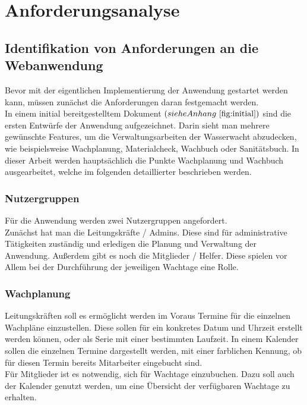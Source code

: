 \documentclass[fontsize=12pt,openright,oneside,paper=a4,BCOR=1cm]{scrbook}
\begin{document}

%
%

\chapter{Anforderungsanalyse}
\section{Identifikation von Anforderungen an die Webanwendung} 
Bevor mit der eigentlichen Implementierung der Anwendung gestartet werden kann, müssen zunächst die Anforderungen daran festgemacht werden. \\
In einem initial bereitgestelltem Dokument $(siehe Anhang ~\ref{fig:initial})$ sind die ersten Entwürfe der Anwendung aufgezeichnet. Darin sieht man mehrere gewünschte Features, um die Verwaltungsarbeiten der Wasserwacht abzudecken, wie beispielsweise \glqq Wachplanung\grqq{}, \glqq Materialcheck\grqq{}, \glqq Wachbuch\grqq{} oder \glqq Sanitätsbuch\grqq{}. In dieser Arbeit werden hauptsächlich die Punkte \glqq Wachplanung\grqq{} und \glqq Wachbuch\grqq{} ausgearbeitet, welche im folgenden detaillierter beschrieben werden. \\ 

\subsection{Nutzergruppen}
Für die Anwendung werden zwei Nutzergruppen angefordert. \\
Zunächst hat man die \glqq Leitungskräfte / Admins\grqq{}. Diese sind für administrative Tätigkeiten zuständig und erledigen die Planung und Verwaltung der Anwendung. 
Außerdem gibt es noch die \glqq Mitglieder / Helfer\grqq{}. Diese spielen vor Allem bei der Durchführung der jeweiligen Wachtage eine Rolle.

\subsection{Wachplanung}
Leitungskräften soll es ermöglicht werden im Voraus Termine für die einzelnen Wachpläne einzustellen. Diese sollen für ein konkretes Datum und Uhrzeit erstellt werden können, oder als Serie mit einer bestimmten Laufzeit. In einem Kalender sollen die einzelnen Termine dargestellt werden, mit einer farblichen Kennung, ob für diesen Termin bereits Mitarbeiter eingebucht sind. \\
Für Mitglieder ist es notwendig, sich für Wachtage einzubuchen. Dazu soll auch der Kalender genutzt werden, um eine Übersicht der verfügbaren Wachtage zu erhalten.
\end{document}

